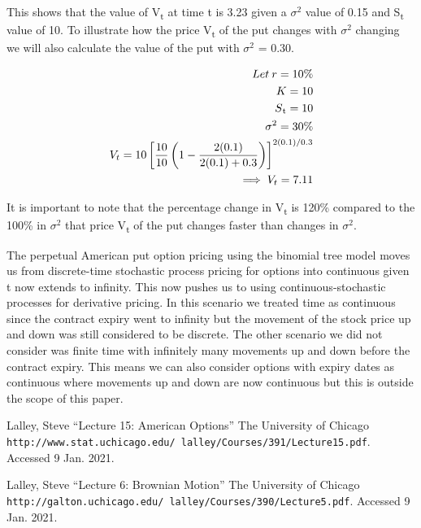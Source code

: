 \documentclass{article}
\begin{document}
This shows that the value of V\textsubscript{t} at time t is 3.23 given a $\sigma^2$ value of 0.15 and S\textsubscript{t} value of 10. To illustrate how the price V\textsubscript{t} of the put changes with $\sigma^2$ changing we will also calculate the value of the put with $\sigma^2$ = 0.30.

\begin{align*}
    Let \medspace r=10\% \\
    K = 10 \\
    S\textsubscript{t} = 10 \\
    \sigma^2 = 30\% \\
    V_{t} = 10 \left[ \frac{10}{10} \left( 1 - \frac{2(0.1)}{ 2(0.1)+0.3 } \right) \right] ^{2(0.1)/0.3 } \\
    \implies V_{t} = 7.11
\end{align*}

It is important to note that the percentage change in V\textsubscript{t} is 120\% compared to the 100\% in $\sigma^2$ that price V\textsubscript{t} of the put changes faster than changes in $\sigma^2$.

The perpetual American put option pricing using the binomial tree model moves us from discrete-time stochastic process pricing for options into continuous given t now extends to infinity. This now pushes us to using continuous-stochastic processes for derivative pricing. In this scenario we treated time as continuous since the contract expiry went to infinity but the movement of the stock price up and down was still considered to be discrete. The other scenario we did not consider was finite time with infinitely many movements up and down before the contract expiry. This means we can also consider options with expiry dates as continuous where movements up and down are now continuous but this is outside the scope of this paper.


\begin{thebibliography}{9}

Lalley, Steve
“Lecture 15: American Options”
The University of Chicago \\
\texttt{http://www.stat.uchicago.edu/~lalley/Courses/391/Lecture15.pdf}.
Accessed 9 Jan. 2021.

Lalley, Steve
“Lecture 6: Brownian Motion”
The University of Chicago \\
\texttt{http://galton.uchicago.edu/~lalley/Courses/390/Lecture5.pdf}.
Accessed 9 Jan. 2021.

\end{thebibliography}
\end{document}
